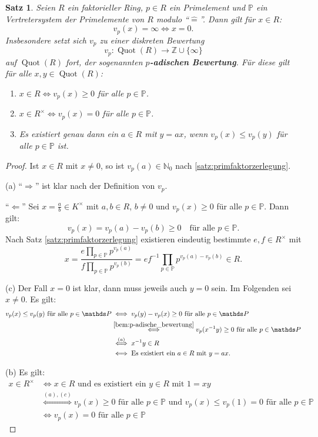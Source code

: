 \documentclass[a4paper, twoside, 11pt, ngerman]{report}
\newcommand{\NN}{\mathds N}
\newcommand{\PP}{\mathds P}
\newcommand{\ZZ}{\mathds Z}
\newcommand{\assoc}{\mathrel{\widehat{=}}}
\DeclareMathOperator{\Quot}{Quot}
\theoremstyle{definistyle}
\newtheorem{satz}{Satz}[section]
\theoremstyle{remark}
\begin{document}
\begin{satz}\label{bem:vp_diskrete_bewertung}
Seien $R$ ein faktorieller Ring, $p \in R$ ein Primelement und $\PP$ ein Vertretersystem der Primelemente von $R$ modulo "`$\assoc$"'. Dann gilt für $x \in R$:
\[
v_p(x) = \infty \iff x = 0.
\]
Insbesondere setzt sich $v_p$ zu einer diskreten Bewertung
\[
v_p \colon \Quot(R) \to \ZZ \cup \{\infty\}
\]
auf $\Quot(R)$ fort, der sogenannten \textbf{$p$-adischen Bewertung}. Für diese gilt für alle $x, y \in \Quot(R)$:
\begin{enumerate}[label=(\alph*)]
    \item $x \in R\iff v_p(x) \geq 0$ für alle $p \in \PP$.
    \item $x \in R^\times \iff v_p(x) = 0$ für alle $p \in \PP$.
    \item Es existiert genau dann ein $a \in R$ mit $y = a x$, wenn $v_p(x) \leq v_p(y)$ für alle $p \in \PP$ ist.
\end{enumerate}
\end{satz}
\begin{proof}
Ist $x\in R$ mit $x\neq 0$, so ist $v_p(a)\in\NN_0$ nach \ref{satz:primfaktorzerlegung}.

(a) "`$\Rightarrow$"' ist klar nach der Definition von $v_p$. 

"`$\Leftarrow$"' Sei $x = \frac{a}{b} \in K^\times$ mit $a,b\in R$, $b\neq 0$ und $v_p(x) \geq 0$ für alle $p \in \PP$. Dann gilt:
\[
v_p(x) = v_p(a) - v_p(b) \geq 0 \quad \text{für alle } p \in \PP.
\]
Nach Satz \ref{satz:primfaktorzerlegung} existieren eindeutig bestimmte $e, f \in R^\times$ mit
\[
x = \frac{e \prod_{p \in \PP} p^{v_p(a)}}{f \prod_{p \in \PP} p^{v_p(b)}} = ef^{-1} \prod_{p \in \PP} p^{v_p(a) - v_p(b)} \in R.
\]

(c) Der Fall $x=0$ ist klar, dann muss jeweils auch $y=0$ sein. Im Folgenden sei $x\neq0$.
Es gilt:
\begin{align*}
v_p(x)\leq v_p(y) \text{ für alle } p \in \PP & \iff
v_p(y) - v_p(x) \geq 0 \text{ für alle } p \in \PP \\
&\overset{\ref{bem:p-adische_bewertung}}{\iff}  v_p(x^{-1}y) \geq 0 \text{ für alle } p \in \PP\\
& \overset{(a)}{\iff} x^{-1}y\in R\\
& \iff \text{Es existiert ein } a\in R \text{ mit } y=ax.
\end{align*}

(b) Es gilt:
\begin{align*}
x \in R^\times &\iff x \in R \text{ und es existiert ein } y \in R \text{ mit } 1 = x y \\
 & \overset{(a),(c)}{\iff} v_p(x) \geq 0 \text{ für alle } p \in \PP \text{ und } v_p(x) \leq v_p(1) = 0
 \text{ für alle } p \in \PP \\
 & \iff v_p(x) = 0 \text{ für alle } p \in \PP
\end{align*}
\end{proof}
\end{document}
